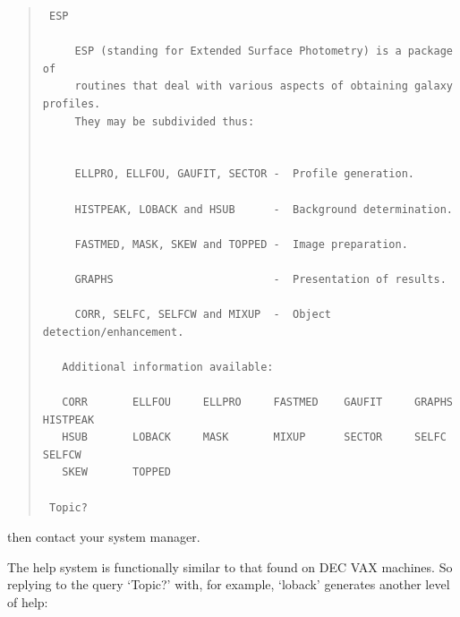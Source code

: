 \documentclass[twoside,11pt]{article}
\newenvironment{myquote}{\begin{quote}\begin{small}}{\end{small}\end{quote}}
\begin{document}
\begin{myquote}
\begin{verbatim}    
 ESP
 
     ESP (standing for Extended Surface Photometry) is a package of
     routines that deal with various aspects of obtaining galaxy profiles.
     They may be subdivided thus:
 
 
     ELLPRO, ELLFOU, GAUFIT, SECTOR -  Profile generation.
 
     HISTPEAK, LOBACK and HSUB      -  Background determination.
 
     FASTMED, MASK, SKEW and TOPPED -  Image preparation.
 
     GRAPHS                         -  Presentation of results.
 
     CORR, SELFC, SELFCW and MIXUP  -  Object detection/enhancement.
 
   Additional information available:
 
   CORR       ELLFOU     ELLPRO     FASTMED    GAUFIT     GRAPHS     HISTPEAK   
   HSUB       LOBACK     MASK       MIXUP      SECTOR     SELFC      SELFCW     
   SKEW       TOPPED
 
 Topic? 
 \end{verbatim}
\end{myquote}

then contact your system manager.

The help system is functionally  similar to that found on DEC VAX machines.
So replying to the query `Topic?' with, for example, `loback' generates 
another level of help:
\end{document}
